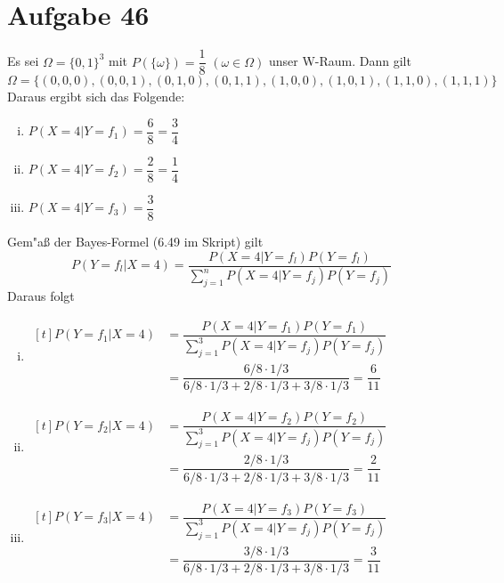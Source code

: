 \section{Aufgabe 46}
\setcounter{section}{46}

Es sei $\Omega = \{0, 1\}^3$ mit $P(\{\omega\}) = \dfrac{1}{8}$ $(\omega \in \Omega)$ unser W-Raum. Dann gilt
\begin{equation*}
    \Omega = \{(0, 0, 0), (0, 0, 1), (0, 1, 0), (0, 1, 1), (1, 0, 0), (1, 0, 1), (1, 1, 0), (1, 1, 1)\}
\end{equation*}
Daraus ergibt sich das Folgende:
\begin{enumerate}[i)]
    \item $P(X = 4 | Y = f_1) = \dfrac{6}{8} = \dfrac{3}{4}$
    \item $P(X = 4 | Y = f_2) = \dfrac{2}{8} = \dfrac{1}{4}$
    \item $P(X = 4 | Y = f_3) = \dfrac{3}{8}$
\end{enumerate}
Gem"a{\ss} der Bayes-Formel (6.49 im Skript) gilt
\begin{equation*}
    P(Y = f_l | X = 4) = \dfrac{P(X = 4 | Y = f_l)P(Y = f_l)}{\sum_{j = 1}^nP(X = 4 | Y = f_j)P(Y = f_j)}
\end{equation*}
Daraus folgt
\begin{enumerate}[i)]
    \item $\begin{aligned}[t]
            P(Y = f_1 | X = 4) &= \dfrac{P(X = 4 | Y = f_1)P(Y = f_1)}{\sum_{j = 1}^3P(X = 4 | Y = f_j)P(Y = f_j)}  \\[5pt]
                               &= \dfrac{6/8 \cdot 1/3}{6/8 \cdot 1/3 + 2/8 \cdot 1/3 + 3/8 \cdot 1/3} = \dfrac{6}{11}
        \end{aligned}$ \\[5pt]
    \item $\begin{aligned}[t]
            P(Y = f_2 | X = 4) &= \dfrac{P(X = 4 | Y = f_2)P(Y = f_2)}{\sum_{j = 1}^3P(X = 4 | Y = f_j)P(Y = f_j)}  \\[5pt]
                               &= \dfrac{2/8 \cdot 1/3}{6/8 \cdot 1/3 + 2/8 \cdot 1/3 + 3/8 \cdot 1/3} = \dfrac{2}{11}
        \end{aligned}$ \\[5pt]
    \item $\begin{aligned}[t]
            P(Y = f_3 | X = 4) &= \dfrac{P(X = 4 | Y = f_3)P(Y = f_3)}{\sum_{j = 1}^3P(X = 4 | Y = f_j)P(Y = f_j)}  \\[5pt]
                               &= \dfrac{3/8 \cdot 1/3}{6/8 \cdot 1/3 + 2/8 \cdot 1/3 + 3/8 \cdot 1/3} = \dfrac{3}{11}
        \end{aligned}$
\end{enumerate}
